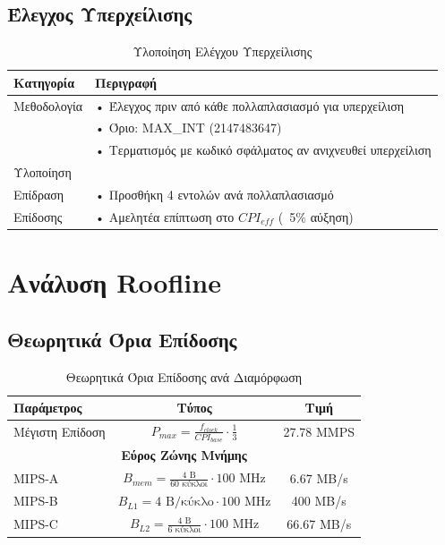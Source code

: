 \documentclass[11pt,a4paper]{article}
\begin{document}
\subsection{Έλεγχος Υπερχείλισης}
\begin{table}[H]
\centering
\small
\begin{tabular}{|l|p{10cm}|}
\hline
\textbf{Κατηγορία} & \textbf{Περιγραφή} \\
\hline
Μεθοδολογία & • Έλεγχος πριν από κάθε πολλαπλασιασμό για υπερχείλιση \\
& • Όριο: MAX\_INT (2147483647) \\
& • Τερματισμός με κωδικό σφάλματος αν ανιχνευθεί υπερχείλιση \\
\hline
Υλοποίηση &  \\
\hline
Επίδραση & • Προσθήκη 4 εντολών ανά πολλαπλασιασμό \\
Επίδοσης & • Αμελητέα επίπτωση στο $CPI_{eff}$ (~5\% αύξηση) \\
\hline
\end{tabular}
\caption{Υλοποίηση Ελέγχου Υπερχείλισης}
\label{tab:overflow}
\end{table}

\section{Ανάλυση Roofline}

\subsection{Θεωρητικά Όρια Επίδοσης}
\begin{table}[h]
\centering
\begin{tabular}{|l|c|c|}
\hline
\textbf{Παράμετρος} & \textbf{Τύπος} & \textbf{Τιμή} \\
\hline
Μέγιστη Επίδοση & $P_{max} = \frac{f_{clock}}{CPI_{base}} \cdot \frac{1}{3}$ & 27.78 MMPS \\
\hline
\multicolumn{3}{|c|}{\textbf{Εύρος Ζώνης Μνήμης}} \\
\hline
MIPS-A & $B_{mem} = \frac{4\text{ B}}{60\text{ κύκλοι}} \cdot 100\text{ MHz}$ & 6.67 MB/s \\
MIPS-B & $B_{L1} = 4\text{ B/κύκλο} \cdot 100\text{ MHz}$ & 400 MB/s \\
MIPS-C & $B_{L2} = \frac{4\text{ B}}{6\text{ κύκλοι}} \cdot 100\text{ MHz}$ & 66.67 MB/s \\
\hline
\end{tabular}
\caption{Θεωρητικά Όρια Επίδοσης ανά Διαμόρφωση}
\end{table}
\end{document}
